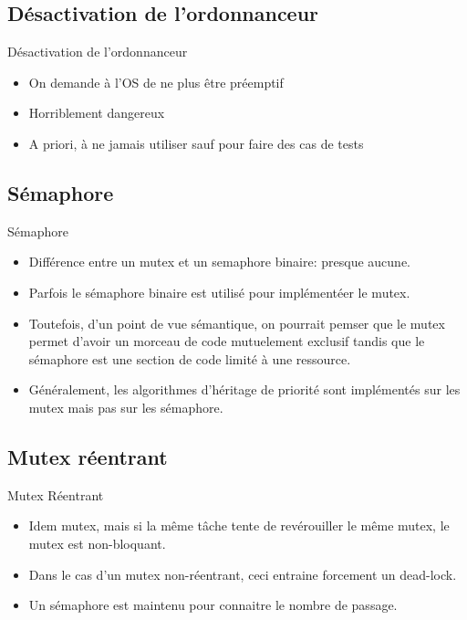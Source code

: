 \subsection{Désactivation de l'ordonnanceur}

\begin{frame}{Désactivation de l'ordonnanceur}
  \begin{itemize}
  \item On demande à l'OS de ne plus être préemptif
  \item Horriblement dangereux
  \item A  priori, à  ne jamais  utiliser sauf pour  faire des  cas de
    tests
  \end{itemize}
\end{frame}

\subsection{Sémaphore}

\begin{frame}{Sémaphore}
  \begin{itemize}
  \item  Différence entre un  mutex et  un semaphore  binaire: presque
    aucune.
  \item Parfois le sémaphore  binaire est utilisé pour implémentéer le
    mutex.
  \item Toutefois,  d'un point de  vue sémantique, on pourrait pemser  que le
    mutex  permet  d'avoir un  morceau  de  code mutuelement  exclusif
    tandis  que le  sémaphore est  une section  de code  limité  à une
    ressource.
  \item  Généralement,  les algorithmes  d'héritage  de priorité  sont
    implémentés sur les mutex mais pas sur les sémaphore.
  \end{itemize}
\end{frame}

\subsection{Mutex réentrant}

\begin{frame}{Mutex Réentrant}
  \begin{itemize}
  \item Idem  mutex, mais  si la même  tâche tente de  revérouiller le
    même mutex, le mutex est non-bloquant.
  \item Dans le cas  d'un mutex non-réentrant, ceci entraine forcement
    un dead-lock.
  \item Un sémaphore est maintenu pour connaitre le nombre de passage.
  \end{itemize}
\end{frame}

